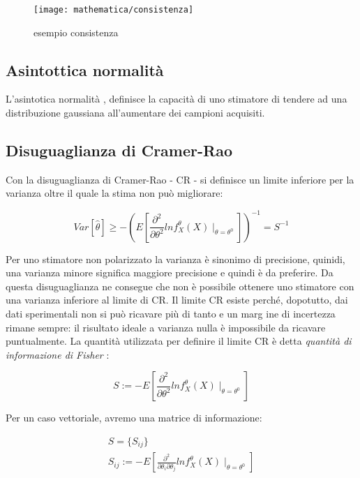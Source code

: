 \begin{figure}[htbp]
  \centering
  \texttt{[image: mathematica/consistenza]}
  \caption{esempio consistenza\label{fig:esconsistenza}}
\end{figure}

\subsection{Asintottica normalità}
L'asintotica normalità , definisce la capacità di uno stimatore di tendere ad una distribuzione gaussiana all'aumentare dei campioni acquisiti.
\subsection{Disuguaglianza di Cramer-Rao}
Con la disuguaglianza di Cramer-Rao  - CR - si definisce un limite inferiore per la varianza oltre il quale la stima non può migliorare:

    \[ Var[\hat{\theta}]\geq - \left( E\left[\frac{\partial^2}{\partial\theta^2} ln f_X^\theta(X)\mid_{\theta=\theta^0}\right] \right)^{-1} = S^{-1} \]

Per uno stimatore non polarizzato la varianza è sinonimo di precisione, quinidi, una varianza minore significa maggiore precisione e quindi è da preferire. Da questa disuguaglianza ne consegue che non è possibile ottenere uno stimatore con una varianza inferiore al limite di CR. Il limite CR esiste perché, dopotutto, dai dati sperimentali non si può ricavare più di tanto e un marg    ine di incertezza rimane sempre: il risultato ideale a varianza nulla è impossibile da ricavare puntualmente.\newline
La quantità utilizzata per definire il limite CR è detta \textit{quantità di informazione di Fisher} :

    \[ S:= -  E\left[\frac{\partial^2}{\partial \theta^2} ln f_X^\theta(X)\mid_{\theta=\theta^0}\right] \]

Per un caso vettoriale, avremo una matrice di informazione:

\begin{gather*}
  S= \{ S_{ij}\}  \\
  S_{ij}:= -  E\left[\frac{\partial^2}{\partial \theta_i\partial \theta_j} ln f_X^\theta(X)\mid_{\theta=\theta^0}\right]
\end{gather*}

